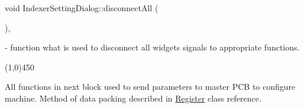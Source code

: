 \mbox{\label{classIndexerSettingDialog_a1a3a501889727528a4f432b233556760}} 
{\footnotesize\ttfamily void Indexer\+Setting\+Dialog\+::\texorpdfstring{disconnect\+All}{disconnectAll} (\begin{DoxyParamCaption}{ }\end{DoxyParamCaption}){\ttfamily [private]}, {\ttfamily [slot]}} - function what is used to disconnect all widgets signals to appropriate functions.
\begin{center}	\line(1,0){450} \end{center}
All functions in next block used to send parameters to master PCB to configure machine. Method of data packing described in \hyperlink{classRegister}{Register} class reference. 
